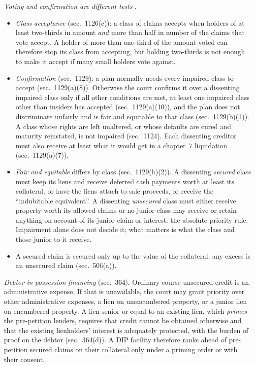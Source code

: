 \begin{qfmethod}
\emph{Voting and confirmation are different tests} \citep[secs.~1124, 1126, 1129]{us-bankruptcy-code-11}.
\begin{itemize}
\item \emph{Class acceptance} (sec.~1126(c)): a class of claims accepts when holders of at least two-thirds in amount \emph{and} more than half in number of the claims that vote accept. A holder of more than one-third of the amount voted can therefore stop its class from accepting, but holding two-thirds is not enough to make it accept if many small holders vote against.
\item \emph{Confirmation} (sec.~1129): a plan normally needs every impaired class to accept (sec.~1129(a)(8)). Otherwise the court confirms it over a dissenting impaired class only if all other conditions are met, at least one impaired class other than insiders has accepted (sec.~1129(a)(10)), and the plan does not discriminate unfairly and is fair and equitable to that class (sec.~1129(b)(1)). A class whose rights are left unaltered, or whose defaults are cured and maturity reinstated, is not impaired (sec.~1124). Each dissenting creditor must also receive at least what it would get in a chapter~7 liquidation (sec.~1129(a)(7)).
\item \emph{Fair and equitable} differs by class (sec.~1129(b)(2)). A dissenting \emph{secured} class must keep its liens and receive deferred cash payments worth at least its collateral, or have the liens attach to sale proceeds, or receive the ``indubitable equivalent''. A dissenting \emph{unsecured} class must either receive property worth its allowed claims or no junior class may receive or retain anything on account of its junior claim or interest: the absolute priority rule. Impairment alone does not decide it; what matters is what the class and those junior to it receive.
\item A secured claim is secured only up to the value of the collateral; any excess is an unsecured claim (sec.~506(a)).
\end{itemize}

\emph{Debtor-in-possession financing} (sec.~364). Ordinary-course unsecured credit is an administrative expense. If that is unavailable, the court may grant priority over other administrative expenses, a lien on unencumbered property, or a junior lien on encumbered property. A lien senior or equal to an existing lien, which \emph{primes} the pre-petition lenders, requires that credit cannot be obtained otherwise and that the existing lienholders' interest is adequately protected, with the burden of proof on the debtor (sec.~364(d)). A DIP facility therefore ranks ahead of pre-petition secured claims on their collateral only under a priming order or with their consent.


\end{qfmethod}
